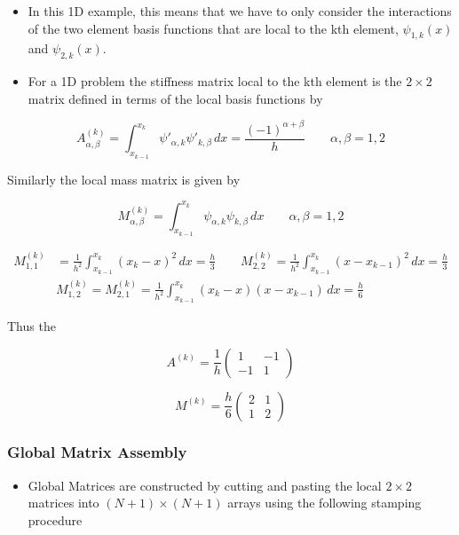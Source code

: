 \documentclass[12pt]{report}
\begin{document}
\begin{itemize}
\item In this 1D example, this means that we have to only consider the interactions of the
two element basis functions that are local to the kth element, $\psi_{1,k}(x)$ and $\psi_{2,k}(x)$.
\item For a 1D problem the stiffness matrix local to the kth element is the ${2}\times{2}$ matrix defined in terms of the local basis functions by
\end{itemize}

\begin{equation}
A^{(k)}_{\alpha,\beta}=\int_{x_{k-1}}^{x_{k}}\psi'_{\alpha,k}\psi'_{k,\beta}\,{dx}=\frac{(-1)^{\alpha+\beta}}{h}\qquad{\alpha,\beta=1,2}
\end{equation}

Similarly the local mass matrix is given by 

\begin{equation}
M^{(k)}_{\alpha,\beta}=\int_{x_{k-1}}^{x_{k}}\psi_{\alpha,k}\psi_{k,\beta}\,{dx}\qquad{\alpha,\beta=1,2}
\end{equation}

\begin{equation}
\begin{split}
M^{(k)}_{1,1}&=\frac{1}{h^2}\int_{x_{k-1}}^{x_{k}}(x_k-x)^2\,{dx}=\frac{h}{3}\qquad{M}^{(k)}_{2,2}=\frac{1}{h^2}\int_{x_{k-1}}^{x_{k}}(x-x_{k-1})^2\,{dx}=\frac{h}{3}\\
&{M}^{(k)}_{1,2}={M}^{(k)}_{2,1}=\frac{1}{h^2}\int_{x_{k-1}}^{x_{k}}(x_k-x)(x-x_{k-1})\,{dx}=\frac{h}{6}
\end{split}
\end{equation}


Thus the 

\[A^{(k)} = \frac{1}{h}
 \begin{pmatrix}
  1 & -1 \\
  -1 & 1 
 \end{pmatrix}
\]


\[M^{(k)} = \frac{h}{6}
 \begin{pmatrix}
  2 & 1 \\
  1 & 2
 \end{pmatrix}
\]

\subsubsection*{Global Matrix Assembly}\label{global}

\begin{itemize}
\item Global Matrices are constructed by cutting and pasting the local $2\times{2}$ matrices into $(N+1)\times(N+1)$ arrays using the following stamping procedure
\end{itemize}
\end{document}
